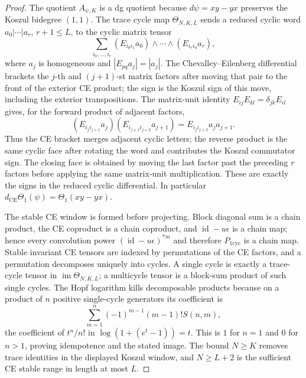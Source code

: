 \documentclass[11pt]{memoir}
\begin{document}
\begin{proof}
  The quotient \(A_{\psi,K}\) is a dg quotient because
  \(d\psi=xy-yx\) preserves the Koszul bidegree \((1,1)\).  The trace
  cycle map \(\Theta_{N,K,L}\) sends a reduced cyclic word
  \(a_0|\cdots|a_r\), \(r+1\leq L\), to the cyclic matrix tensor
  \[
    \sum_{i_0,\ldots,i_r}
    (E_{i_0i_1}a_0)\wedge\cdots\wedge(E_{i_ri_0}a_r),
  \]
  where \(a_j\) is homogeneous and \(|E_{pq}a_j|=|a_j|\).  The
  Chevalley--Eilenberg differential brackets the \(j\)-th and
  \((j+1)\)-st matrix factors after moving that pair to the front of the
  exterior CE product; the sign is the Koszul sign of this move, including
  the exterior transpositions.  The matrix-unit identity
  \(E_{ij}E_{kl}=\delta_{jk}E_{il}\) gives, for the forward product of
  adjacent factors,
  \[
    (E_{i_ji_{j+1}}a_j)(E_{i_{j+1}i_{j+2}}a_{j+1})
      =E_{i_ji_{j+2}}a_ja_{j+1}.
  \]
  Thus the CE bracket merges adjacent cyclic letters; the reverse product
  is the same cyclic face after rotating the word and contributes the
  Koszul commutator sign.  The closing face is obtained by moving the last
  factor past the preceding \(r\) factors before applying the same
  matrix-unit multiplication.  These are exactly the signs in the reduced
  cyclic differential.  In particular
  \(d_{\mathrm{CE}}\Theta_1(\psi)=\Theta_1(xy-yx)\).

  The stable CE window is formed before projecting.  Block diagonal sum
  is a chain product, the CE coproduct is a chain coproduct, and
  \(\operatorname{id}-u\epsilon\) is a chain map; hence every
  convolution power \((\operatorname{id}-u\epsilon)^{*m}\) and therefore \(P_{1\mathrm{cyc}}\) is a
  chain map.  Stable invariant CE tensors are indexed by permutations of
  the CE factors, and a permutation decomposes uniquely into cycles.  A
  single cycle is exactly a trace-cycle tensor in
  \(\operatorname{im}\Theta_{N,K,L}\); a multicycle tensor is a block-sum
  product of such single cycles.  The Hopf logarithm kills decomposable
  products because on a product of \(n\) positive single-cycle generators
  its coefficient is
  \[
    \sum_{m=1}^{n}(-1)^{m-1}(m-1)!S(n,m),
  \]
  the coefficient of \(t^n/n!\) in \(\log(1+(e^t-1))=t\).  This is \(1\)
  for \(n=1\) and \(0\) for \(n>1\), proving idempotence and the stated
image.  The bound \(N\geq K\) removes trace identities in the displayed
  Koszul window, and \(N\geq L+2\) is the sufficient CE stable range in length
  at most \(L\).
\end{proof}
\end{document}
